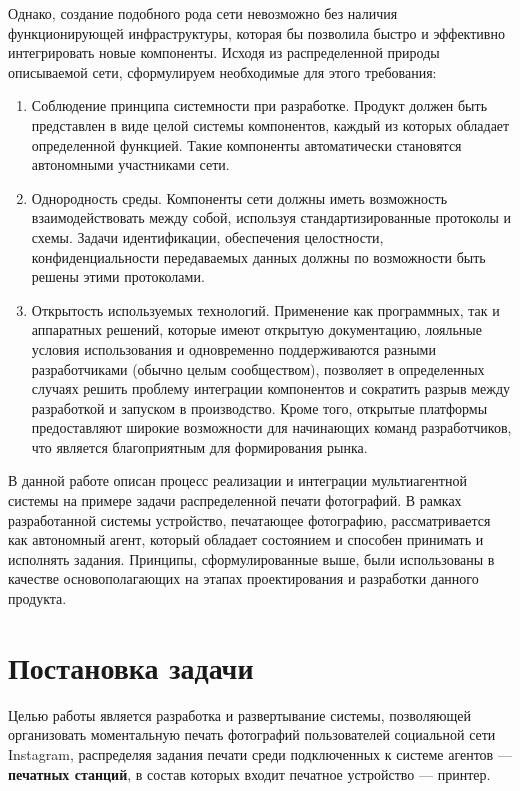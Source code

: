 \documentclass[a4paper,14pt,href,draft]{article}
\begin{document}
Однако, создание подобного рода сети невозможно без наличия функционирующей инфраструктуры, которая бы позволила быстро
и эффективно интегрировать новые компоненты. Исходя из распределенной природы описываемой сети, сформулируем необходимые
для этого требования:

\begin{enumerate}
  \item Соблюдение принципа системности при разработке\cite{SystemPrinciple}. Продукт должен быть представлен в виде
  целой системы компонентов, каждый из которых обладает определенной функцией. Такие компоненты автоматически становятся
  автономными участниками сети.

  \item Однородность среды. Компоненты сети должны иметь возможность взаимодействовать между собой, используя
  стандартизированные протоколы и схемы. Задачи идентификации, обеспечения целостности, конфиденциальности передаваемых
  данных должны по возможности быть решены этими протоколами.

  \item Открытость используемых технологий. Применение как программных, так и аппаратных решений, которые имеют
  открытую документацию, лояльные  условия использования и одновременно поддерживаются разными разработчиками
  (обычно целым сообществом), позволяет в определенных случаях решить проблему интеграции компонентов и сократить разрыв
  между разработкой и запуском в производство. Кроме того, открытые платформы предоставляют широкие возможности для
  начинающих команд разработчиков, что является благоприятным для формирования рынка.
\end{enumerate}

В данной работе описан процесс реализации и интеграции муль\-тиагентной системы на примере задачи распределенной
печати фотографий. В рамках разработанной системы устройство, печатающее фотографию, рассматривается как автономный
агент, который обладает состоянием и способен принимать и исполнять задания. Принципы, сформулированные выше, были
использованы в качестве основополагающих на этапах проектирования и разработки данного продукта.

\newpage
\section*{Постановка задачи}
Целью работы является разработка и развертывание системы, позволяющей организовать моментальную печать фотографий
пользователей социальной сети Instagram, распределяя задания печати среди подключенных к системе агентов ---
\textbf{печатных станций}, в состав которых входит печатное устройство --- принтер.
\end{document}
